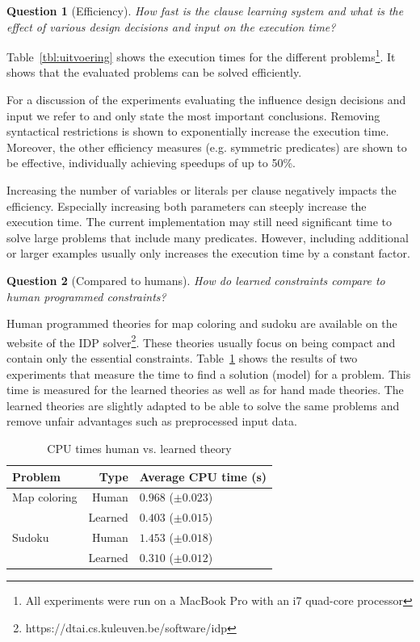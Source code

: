 \documentclass[letterpaper]{article}
\newtheorem{question}{Question}
\theoremstyle{definition}
\begin{document}
\begin{question}[Efficiency]
  How fast is the clause learning system and what is the effect of various design decisions and input on the execution time?
\end{question}

Table~\ref{tbl:uitvoering} shows the execution times for the different problems\footnote{All experiments were run on a MacBook Pro with an i7 quad-core processor}.
It shows that the evaluated problems can be solved efficiently.

For a discussion of the experiments evaluating the influence design decisions and input we refer to \cite{kolb2015thesis} and only state the most important conclusions.
Removing syntactical restrictions is shown to exponentially increase the execution time.
Moreover, the other efficiency measures (e.g. symmetric predicates) are shown to be effective, individually achieving speedups of up to 50\%.

Increasing the number of variables or literals per clause negatively impacts the efficiency.
Especially increasing both parameters can steeply increase the execution time.
The current implementation may still need significant time to solve large problems that include many predicates.
However, including additional or larger examples usually only increases the execution time by a constant factor.

\begin{question}[Compared to humans]
  How do learned constraints compare to human programmed constraints?
\end{question}
Human programmed theories for map coloring and sudoku are available on the website of the IDP solver\footnote{https://dtai.cs.kuleuven.be/software/idp}.
These theories usually focus on being compact and contain only the essential constraints.
Table~\ref{tbl:mens} shows the results of two experiments that measure the time to find a solution (model) for a problem.
This time is measured for the learned theories as well as for hand made theories.
The learned theories are slightly adapted to be able to solve the same problems and remove unfair advantages such as preprocessed input data.

  \begin{table}[!htp]
    \caption{CPU times human vs. learned theory}
    \begin{tabularx}{\linewidth}{lr|X}
      \textbf{Problem} & \textbf{Type} & \textbf{Average CPU time (s)} \\
      \toprule
      Map coloring & Human & $0.968$  ($\pm 0.023$) \\
      & Learned & $0.403$       ($\pm 0.015$) \\
      \midrule
      Sudoku & Human & $1.453$    ($\pm 0.018$) \\
      & Learned & $0.310$       ($\pm 0.012$)
    \end{tabularx}
    \label{tbl:mens}
  \end{table}
\end{document}
